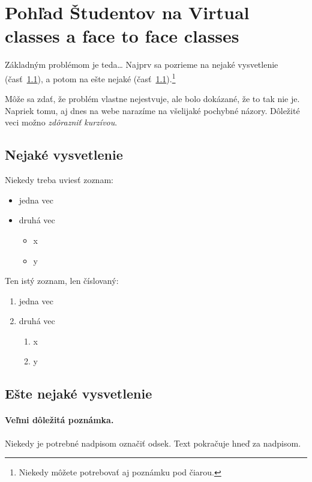 \documentclass[10pt,twoside,slovak,a4paper]{article}
\begin{document}
\section{Pohľad Študentov na Virtual classes a face to face classes} \label{3}

Základným problémom je teda\ldots{} Najprv sa pozrieme na nejaké vysvetlenie (časť~\ref{ina:nejake}), a potom na ešte nejaké (časť~\ref{ina:nejake}).\footnote{Niekedy môžete potrebovať aj poznámku pod čiarou.}

Môže sa zdať, že problém vlastne nejestvuje, ale bolo dokázané, že to tak nie je. Napriek tomu, aj dnes na webe\cite{Bettinger:Staged} narazíme na všelijaké pochybné názory. Dôležité veci možno \emph{zdôrazniť kurzívou}.


\subsection{Nejaké vysvetlenie} \label{ina:nejake}

Niekedy treba uviesť zoznam:

\begin{itemize}
\item jedna vec
\item druhá vec
	\begin{itemize}
	\item x
	\item y
	\end{itemize}
\end{itemize}

Ten istý zoznam, len číslovaný:

\begin{enumerate}
\item jedna vec
\item druhá vec
	\begin{enumerate}
	\item x
	\item y
	\end{enumerate}
\end{enumerate}


\subsection{Ešte nejaké vysvetlenie} \label{ina:este}

\paragraph{Veľmi dôležitá poznámka.}
Niekedy je potrebné nadpisom označiť odsek. Text pokračuje hneď za nadpisom.
\end{document}
